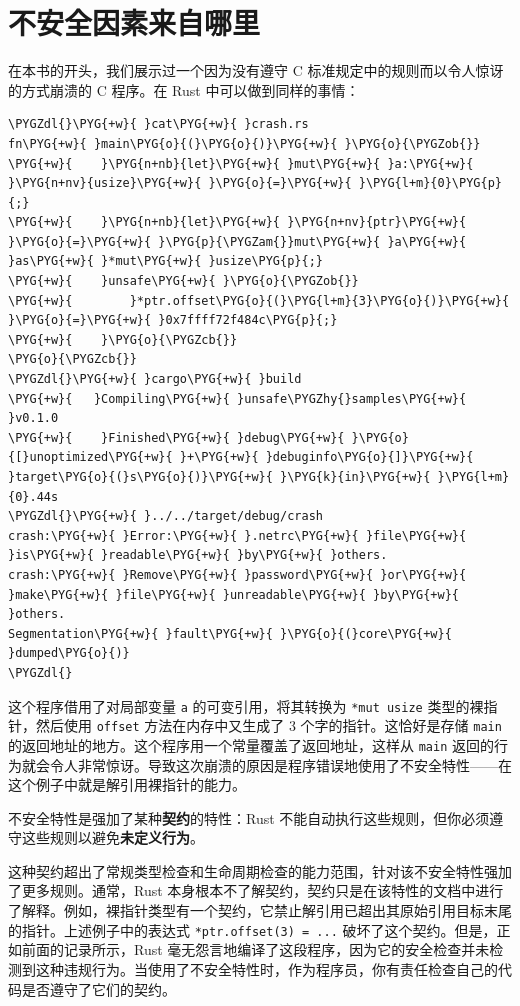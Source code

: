 \section{不安全因素来自哪里}

在本书的开头，我们展示过一个因为没有遵守 C 标准规定中的规则而以令人惊讶的方式崩溃的 C 程序。在 Rust 中可以做到同样的事情：

\begin{Verbatim}[commandchars=\\\{\},breaklines=true,breakanywhere=true,fontsize=\codefont,xleftmargin=17bp]
\PYGZdl{}\PYG{+w}{ }cat\PYG{+w}{ }crash.rs
fn\PYG{+w}{ }main\PYG{o}{(}\PYG{o}{)}\PYG{+w}{ }\PYG{o}{\PYGZob{}}
\PYG{+w}{    }\PYG{n+nb}{let}\PYG{+w}{ }mut\PYG{+w}{ }a:\PYG{+w}{ }\PYG{n+nv}{usize}\PYG{+w}{ }\PYG{o}{=}\PYG{+w}{ }\PYG{l+m}{0}\PYG{p}{;}
\PYG{+w}{    }\PYG{n+nb}{let}\PYG{+w}{ }\PYG{n+nv}{ptr}\PYG{+w}{ }\PYG{o}{=}\PYG{+w}{ }\PYG{p}{\PYGZam{}}mut\PYG{+w}{ }a\PYG{+w}{ }as\PYG{+w}{ }*mut\PYG{+w}{ }usize\PYG{p}{;}
\PYG{+w}{    }unsafe\PYG{+w}{ }\PYG{o}{\PYGZob{}}
\PYG{+w}{        }*ptr.offset\PYG{o}{(}\PYG{l+m}{3}\PYG{o}{)}\PYG{+w}{ }\PYG{o}{=}\PYG{+w}{ }0x7ffff72f484c\PYG{p}{;}
\PYG{+w}{    }\PYG{o}{\PYGZcb{}}
\PYG{o}{\PYGZcb{}}
\PYGZdl{}\PYG{+w}{ }cargo\PYG{+w}{ }build
\PYG{+w}{   }Compiling\PYG{+w}{ }unsafe\PYGZhy{}samples\PYG{+w}{ }v0.1.0
\PYG{+w}{    }Finished\PYG{+w}{ }debug\PYG{+w}{ }\PYG{o}{[}unoptimized\PYG{+w}{ }+\PYG{+w}{ }debuginfo\PYG{o}{]}\PYG{+w}{ }target\PYG{o}{(}s\PYG{o}{)}\PYG{+w}{ }\PYG{k}{in}\PYG{+w}{ }\PYG{l+m}{0}.44s
\PYGZdl{}\PYG{+w}{ }../../target/debug/crash
crash:\PYG{+w}{ }Error:\PYG{+w}{ }.netrc\PYG{+w}{ }file\PYG{+w}{ }is\PYG{+w}{ }readable\PYG{+w}{ }by\PYG{+w}{ }others.
crash:\PYG{+w}{ }Remove\PYG{+w}{ }password\PYG{+w}{ }or\PYG{+w}{ }make\PYG{+w}{ }file\PYG{+w}{ }unreadable\PYG{+w}{ }by\PYG{+w}{ }others.
Segmentation\PYG{+w}{ }fault\PYG{+w}{ }\PYG{o}{(}core\PYG{+w}{ }dumped\PYG{o}{)}
\PYGZdl{}
\end{Verbatim}

这个程序借用了对局部变量 \texttt{a} 的可变引用，将其转换为 \texttt{*mut usize} 类型的裸指针，然后使用 \texttt{offset} 方法在内存中又生成了 3 个字的指针。这恰好是存储 \texttt{main} 的返回地址的地方。这个程序用一个常量覆盖了返回地址，这样从 \texttt{main} 返回的行为就会令人非常惊讶。导致这次崩溃的原因是程序错误地使用了不安全特性——在这个例子中就是解引用裸指针的能力。

不安全特性是强加了某种\textbf{契约}的特性：Rust 不能自动执行这些规则，但你必须遵守这些规则以避免\textbf{未定义行为}。

这种契约超出了常规类型检查和生命周期检查的能力范围，针对该不安全特性强加了更多规则。通常，Rust 本身根本不了解契约，契约只是在该特性的文档中进行了解释。例如，裸指针类型有一个契约，它禁止解引用已超出其原始引用目标末尾的指针。上述例子中的表达式 \texttt{*ptr.offset(3) = ...} 破坏了这个契约。但是，正如前面的记录所示，Rust 毫无怨言地编译了这段程序，因为它的安全检查并未检测到这种违规行为。当使用了不安全特性时，作为程序员，你有责任检查自己的代码是否遵守了它们的契约。

